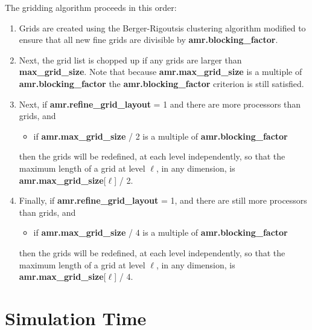 \noindent The gridding algorithm proceeds in this order:

\begin{enumerate}
\item Grids are created using the Berger-Rigoutsis clustering algorithm 
modified to ensure that all new fine grids are divisible by {\bf amr.blocking\_factor}.

\item Next, the grid list is chopped up if any grids are larger than {\bf max\_grid\_size}.
Note that because {\bf amr.max\_grid\_size} is a multiple of {\bf amr.blocking\_factor}
the {\bf amr.blocking\_factor} criterion is still satisfied. 

\item Next, if {\bf amr.refine\_grid\_layout} = 1 and there are more processors than grids, and
\begin{itemize}
\item if {\bf amr.max\_grid\_size} / 2 is a multiple of {\bf amr.blocking\_factor}
\end{itemize}
then the grids will be redefined, at each level independently, so that the 
maximum length of a grid at level $\ell$, in any dimension, 
is {\bf amr.max\_grid\_size}[$\ell$] / 2.  

\item Finally, if {\bf amr.refine\_grid\_layout} = 1,  and there are still more processors
than grids, and 
\begin{itemize}
\item if {\bf amr.max\_grid\_size} / 4 is a multiple of {\bf amr.blocking\_factor}
\end{itemize}
then the grids will be redefined, at each level independently, so that the 
maximum length of a grid at level $\ell$, in any dimension, 
is {\bf amr.max\_grid\_size}[$\ell$] / 4.


\end{enumerate}

\section{Simulation Time}

